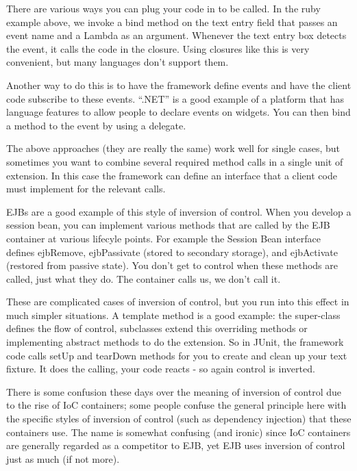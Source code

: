 \documentclass{book}
\begin{document}
There are various ways you can plug your code in to be called. 
In the ruby example above, we invoke a bind method on the text entry field that passes an event name and a Lambda as an argument.
Whenever the text entry box detects the event, it calls the code in the closure. Using closures like this is very convenient, but many languages don't support them.

Another way to do this is to have the framework define events and have the client code subscribe to these events.
``.NET'' is a good example of a platform that has language features to allow people to declare events on widgets.
You can then bind a method to the event by using a delegate.

The above approaches (they are really the same) work well for single cases, but sometimes you want to combine several required method calls in a single unit of extension.
In this case the framework can define an interface that a client code must implement for the relevant calls.

EJBs are a good example of this style of inversion of control. 
When you develop a session bean, you can implement various methods that are called by the EJB container at various lifecyle points.
For example the Session Bean interface defines ejbRemove, ejbPassivate (stored to secondary storage), and ejbActivate (restored from passive state).
You don't get to control when these methods are called, just what they do. The container calls us, we don't call it.

These are complicated cases of inversion of control, but you run into this effect in much simpler situations.
A template method is a good example: the super-class defines the flow of control, subclasses extend this overriding methods or implementing abstract methods to do the extension.
So in JUnit, the framework code calls setUp and tearDown methods for you to create and clean up your text fixture. It does the calling, your code reacts - so again control is inverted.

There is some confusion these days over the meaning of inversion of control due to the rise of IoC containers;
some people confuse the general principle here with the specific styles of inversion of control (such as dependency injection)
that these containers use. The name is somewhat confusing (and ironic) since IoC containers are generally regarded as a competitor to EJB,
yet EJB uses inversion of control just as much (if not more).
\end{document}
